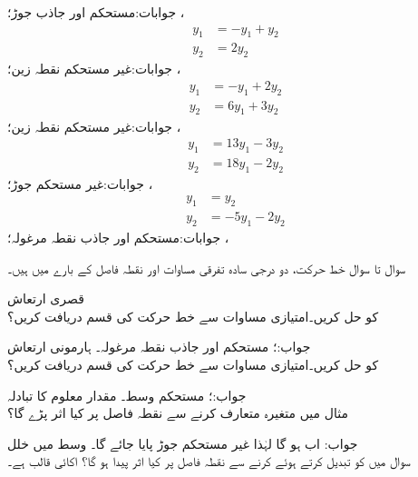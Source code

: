 جوابات:مستحکم اور جاذب جوڑ؛ ، 
\begin{align*}
y_1&=-y_1+y_2\\
y_2&=2y_2
\end{align*}
جوابات:غیر مستحکم نقطہ زین؛ ، 
\begin{align*}
y_1&=-y_1+2y_2\\
y_2&=6y_1+3y_2
\end{align*}
جوابات:غیر مستحکم نقطہ زین؛ ، 
\begin{align*}
y_1&=13y_1-3y_2\\
y_2&=18y_1-2y_2
\end{align*}
جوابات:غیر مستحکم جوڑ؛ ، 
\begin{align*}
y_1&=y_2\\
y_2&=-5y_1-2y_2
\end{align*}
جوابات:مستحکم اور جاذب نقطہ مرغولہ؛ ، \\ 

سوال  تا سوال  خط حرکت، دو درجی سادہ تفرقی مساوات اور نقطہ فاصل کے بارے میں ہیں۔

 \quad قصری ارتعاش\\
 کو حل کریں۔امتیازی مساوات سے خط حرکت کی قسم دریافت کریں؟

جواب:؛ مستحکم اور جاذب نقطہ مرغولہ۔
 \quad ہارمونی ارتعاش\\
 کو حل کریں۔امتیازی مساوات سے خط حرکت کی قسم دریافت کریں؟

جواب:؛ مستحکم وسط۔
 \quad مقدار معلوم کا تبادلہ\\
مثال  میں متغیرہ  متعارف کرنے سے نقطہ فاصل پر کیا اثر پڑے گا؟

جواب: اب  ہو گا لہٰذا غیر مستحکم جوڑ پایا جائے گا۔
 \quad وسط میں خلل\\
سوال  میں  کو تبدیل کرتے ہوئے  کرنے سے نقطہ فاصل پر کیا اثر پیدا ہو گا؟   اکائی قالب ہے۔ 

